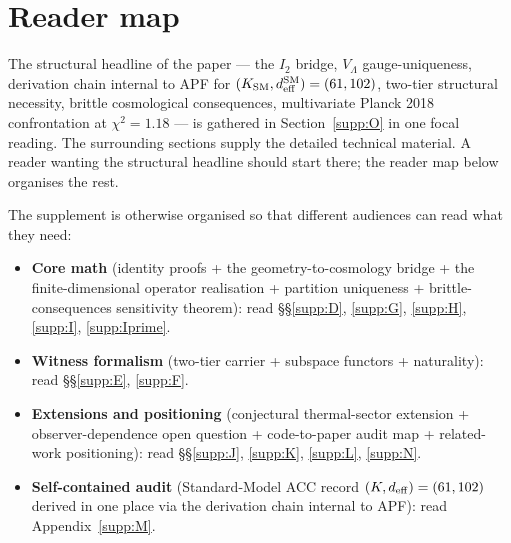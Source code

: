 \documentclass[11pt]{article}
\theoremstyle{plain}
\theoremstyle{definition}
\theoremstyle{remark}
\begin{document}
\bigskip
\tableofcontents
\newpage

\section*{Reader map}\label{supp:readermap}

\begin{apfbox}[title={Start here: \S\ref{supp:O} is the integrated non-trivial content of Paper~8}]
\noindent The structural headline of the paper --- the $I_2$ bridge, $V_\Lambda$ gauge-uniqueness, derivation chain internal to APF for $(K_{\rm SM}, d_{\rm eff}^{\rm SM}) = (61, 102)$, two-tier structural necessity, brittle cosmological consequences, multivariate Planck 2018 confrontation at $\chi^2 = 1.18$ --- is gathered in Section~\ref{supp:O} in one focal reading.  The surrounding sections supply the detailed technical material.  A reader wanting the structural headline should start there; the reader map below organises the rest.
\end{apfbox}

\bigskip

The supplement is otherwise organised so that different audiences can read what they need:

\begin{itemize}[leftmargin=2em,itemsep=3pt]
  \item \textbf{Core math} (identity proofs + the geometry-to-cosmology bridge + the finite-dimensional operator realisation + partition uniqueness + brittle-consequences sensitivity theorem): read \S\S\ref{supp:D}, \ref{supp:G}, \ref{supp:H}, \ref{supp:I}, \ref{supp:Iprime}.
  \item \textbf{Witness formalism} (two-tier carrier + subspace functors + naturality): read \S\S\ref{supp:E}, \ref{supp:F}.
  \item \textbf{Extensions and positioning} (conjectural thermal-sector extension + observer-dependence open question + code-to-paper audit map + related-work positioning): read \S\S\ref{supp:J}, \ref{supp:K}, \ref{supp:L}, \ref{supp:N}.
  \item \textbf{Self-contained audit} (Standard-Model ACC record $(K, d_{\rm eff}) = (61, 102)$ derived in one place via the derivation chain internal to APF): read Appendix~\ref{supp:M}.
\end{itemize}
\end{document}

